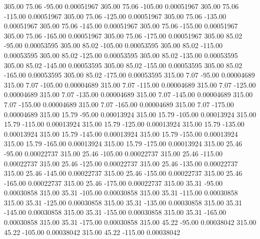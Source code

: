     305.00     75.06    -95.00     0.00051967
    305.00     75.06   -105.00     0.00051967
    305.00     75.06   -115.00     0.00051967
    305.00     75.06   -125.00     0.00051967
    305.00     75.06   -135.00     0.00051967
    305.00     75.06   -145.00     0.00051967
    305.00     75.06   -155.00     0.00051967
    305.00     75.06   -165.00     0.00051967
    305.00     75.06   -175.00     0.00051967
    305.00     85.02    -95.00     0.00053595
    305.00     85.02   -105.00     0.00053595
    305.00     85.02   -115.00     0.00053595
    305.00     85.02   -125.00     0.00053595
    305.00     85.02   -135.00     0.00053595
    305.00     85.02   -145.00     0.00053595
    305.00     85.02   -155.00     0.00053595
    305.00     85.02   -165.00     0.00053595
    305.00     85.02   -175.00     0.00053595
    315.00      7.07    -95.00     0.00004689
    315.00      7.07   -105.00     0.00004689
    315.00      7.07   -115.00     0.00004689
    315.00      7.07   -125.00     0.00004689
    315.00      7.07   -135.00     0.00004689
    315.00      7.07   -145.00     0.00004689
    315.00      7.07   -155.00     0.00004689
    315.00      7.07   -165.00     0.00004689
    315.00      7.07   -175.00     0.00004689
    315.00     15.79    -95.00     0.00013924
    315.00     15.79   -105.00     0.00013924
    315.00     15.79   -115.00     0.00013924
    315.00     15.79   -125.00     0.00013924
    315.00     15.79   -135.00     0.00013924
    315.00     15.79   -145.00     0.00013924
    315.00     15.79   -155.00     0.00013924
    315.00     15.79   -165.00     0.00013924
    315.00     15.79   -175.00     0.00013924
    315.00     25.46    -95.00     0.00022737
    315.00     25.46   -105.00     0.00022737
    315.00     25.46   -115.00     0.00022737
    315.00     25.46   -125.00     0.00022737
    315.00     25.46   -135.00     0.00022737
    315.00     25.46   -145.00     0.00022737
    315.00     25.46   -155.00     0.00022737
    315.00     25.46   -165.00     0.00022737
    315.00     25.46   -175.00     0.00022737
    315.00     35.31    -95.00     0.00030858
    315.00     35.31   -105.00     0.00030858
    315.00     35.31   -115.00     0.00030858
    315.00     35.31   -125.00     0.00030858
    315.00     35.31   -135.00     0.00030858
    315.00     35.31   -145.00     0.00030858
    315.00     35.31   -155.00     0.00030858
    315.00     35.31   -165.00     0.00030858
    315.00     35.31   -175.00     0.00030858
    315.00     45.22    -95.00     0.00038042
    315.00     45.22   -105.00     0.00038042
    315.00     45.22   -115.00     0.00038042
